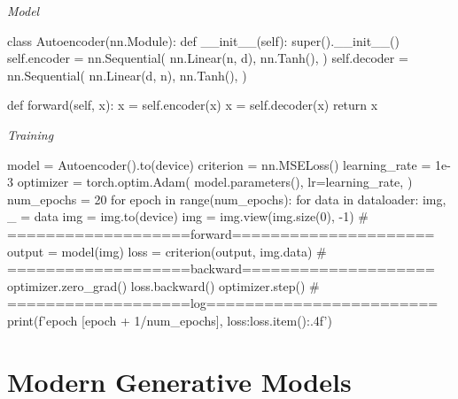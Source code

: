 \documentclass{article}
\begin{document}
\begin{minipage}{\textwidth}
\vspace{8pt}
\emph{Model}
\vspace{8pt}
\begin{ipythonnb}
class Autoencoder(nn.Module):
    def __init__(self):
        super().__init__()
        self.encoder = nn.Sequential(
            nn.Linear(n, d),
            nn.Tanh(),
        )
        self.decoder = nn.Sequential(
            nn.Linear(d, n),
            nn.Tanh(),
        )

    def forward(self, x):
        x = self.encoder(x)
        x = self.decoder(x)
        return x
\end{ipythonnb}
\end{minipage}

\begin{minipage}{\textwidth}
\vspace{8pt}
\emph{Training}
\vspace{8pt}
\begin{ipythonnb}
model = Autoencoder().to(device)
criterion = nn.MSELoss()
learning_rate = 1e-3
optimizer = torch.optim.Adam(
    model.parameters(),
    lr=learning_rate,
)
num_epochs = 20
for epoch in range(num_epochs):
    for data in dataloader:
        img, _ = data
        img = img.to(device)
        img = img.view(img.size(0), -1)
        # ===================forward=====================
        output = model(img)  
        loss = criterion(output, img.data)
        # ===================backward====================
        optimizer.zero_grad()
        loss.backward()
        optimizer.step()
    # ===================log========================
    print(f'epoch [{epoch + 1}/{num_epochs}], loss:{loss.item():.4f}')
\end{ipythonnb}
\end{minipage}

\section{Modern Generative Models}
\end{document}
